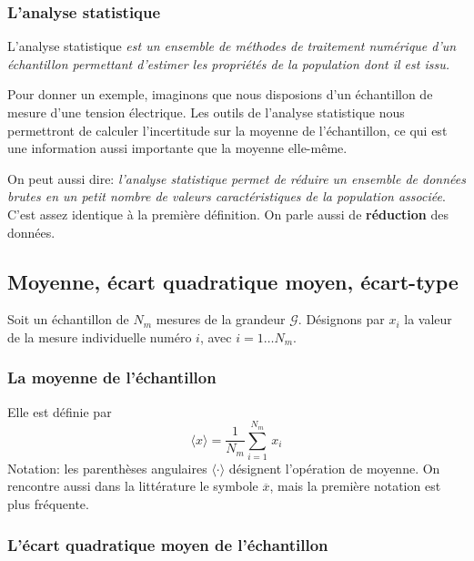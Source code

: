 \documentclass[main.tex]{subfiles}
\begin{document}
\subsubsection{L'analyse statistique}

L'analyse statistique \textit{est un ensemble de méthodes de traitement numérique d'un échantillon permettant d'estimer les propriétés de la population dont il est issu.}

Pour donner un exemple, imaginons que nous disposions d'un échantillon de mesure d'une tension électrique. Les outils de l'analyse statistique nous permettront de calculer l'incertitude sur la moyenne de l'échantillon, ce qui est une information aussi importante que la moyenne elle-même.

On peut aussi dire: \textit{l'analyse statistique permet de réduire un ensemble de données brutes en un petit nombre de valeurs caractéristiques de la population associée}. C'est assez identique à la première définition. On parle aussi de \textbf{réduction} des données.

\subsection{Moyenne, écart quadratique moyen, écart-type}

Soit un échantillon de $N_m$ mesures de la grandeur $\mathcal{G}$. Désignons par $x_i$ la valeur de la mesure individuelle numéro $i$, avec $i=1\dots N_m$.

\subsubsection{La moyenne de l'échantillon}

Elle est définie par
\begin{equation}
    \langle x\rangle=\frac{1}{N_m}\sum\limits_{i=1}^{N_m}\,x_i
\end{equation}
Notation: les parenthèses angulaires $\langle\cdot\rangle$ désignent l'opération de moyenne. On rencontre aussi dans la littérature le symbole $\overline{x}$, mais la première notation est plus fréquente.

\subsubsection{L'écart quadratique moyen de l'échantillon}
\end{document}
